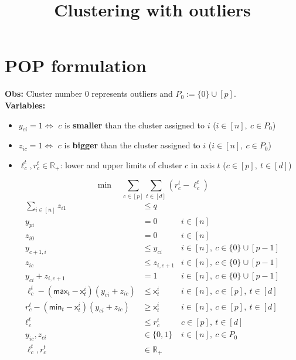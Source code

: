 \documentclass[12pt,A4wide]{article}
\begin{document}
\title{Clustering with outliers}
\date{}

\maketitle

\newcommand{\x}{\mathsf{x}}
\newcommand{\MAX}{\mathsf{max}}
\newcommand{\MIN}{\mathsf{min}}

\section*{POP formulation}

\textbf{Obs:} Cluster number 0 represents outliers and $P_0 := \{0\} \cup [p]$. \\

\textbf{Variables:}
\begin{itemize}
	\item $y_{ci} = 1 \Leftrightarrow$ $c$ is \textbf{smaller} than the cluster assigned to $i$ ($i \in [n],~ c \in P_0$)
	\item $z_{ic} = 1 \Leftrightarrow$ $c$ is \textbf{bigger} than the cluster assigned to $i$ ($i \in [n],~ c \in P_0$)
	\item $\ell^t_c, r^t_c\in \mathbb{R}_+$: lower and upper limits of cluster $c$ in axis $t$ ($c \in [p], ~ t \in [d]$)
\end{itemize}

$$
\min \quad \sum_{c \in [p]} \sum_{t \in [d]} (r^t_c - \ell^t_c) 
$$
\begin{align}
\sum_{i \in [n]} z_{i1} &\leq q & \\
y_{pi} & = 0 & i \in [n]\\
z_{i0} & = 0 & i \in [n]\\
y_{c+1,i}	&\leq y_{ci} & i \in [n],~ c \in \{0\} \cup [p-1]\\
\label{eq:consec_z} z_{ic}	&\leq z_{i, c+1} & i \in [n],~ c \in \{0\} \cup [p-1]\\
\label{eq:exclusion_yz} y_{ci} + z_{i,c+1} & = 1 & i \in [n],~ c \in \{0\} \cup [p-1]\\
\ell^t_c - (\MAX_t - \x^i_t) (y_{ci} + z_{ic})&\leq \x^i_t  & i \in [n],~ c \in [p],~ t \in [d]\\
r^t_c - (\MIN_t - \x^i_t) (y_{ci} + z_{ic})&\geq \x^i_t  & i \in [n],~ c \in [p],~ t \in [d]\\
\ell^t_c &\leq r^t_c & c \in [p],~ t \in [d]\\
y_{ic}, z_{ci} &\in \{0,1\} & i \in [n],~ c \in P_0\\
\ell^t_c, r^t_c &\in \mathbb{R}_+
\end{align}
\end{document}

